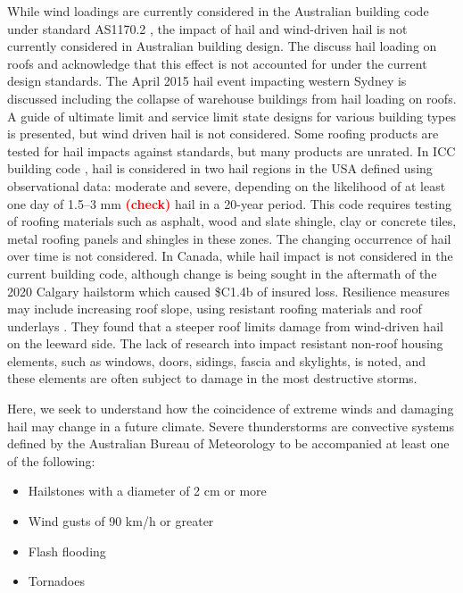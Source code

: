 \documentclass[]{agujournal2019}\usepackage[]{graphicx}\usepackage[]{xcolor}
\newcommand*{\todo}[1]{\textbf{\textcolor{red}{(#1)}}}
\begin{document}
While wind loadings are currently considered in the Australian building code \cite{ABCB_2024} under standard AS1170.2 \cite{Standards_2021}, the impact of hail and wind-driven hail is not currently considered in Australian building design. The  discuss hail loading on roofs and acknowledge that this effect is not accounted for under the current design standards. The April 2015 hail event impacting western Sydney is discussed including the collapse of warehouse buildings from hail loading on roofs. A guide of ultimate limit and service limit state designs for various building types is presented, but wind driven hail is not considered. Some roofing products are tested for hail impacts against standards, but many products are unrated. In ICC building code \cite{ICC_2008}, hail is considered in two hail regions in the USA defined using observational data: moderate and severe, depending on the likelihood of at least one day of 1.5--3 mm \todo{check} hail in a 20-year period. This code requires testing of roofing materials such as asphalt, wood and slate shingle, clay or concrete tiles, metal roofing panels and shingles in these zones. The changing occurrence of hail over time is not considered. In Canada, while hail impact is not considered in the current building code, although change is being sought in the aftermath of the 2020 Calgary hailstorm which caused \$C1.4b of insured loss. Resilience measures may include increasing roof slope, using resistant roofing materials and roof underlays \cite{ICLR_2018}. They found that a steeper roof limits damage from wind-driven hail on the leeward side. The lack of research into impact resistant non-roof housing elements, such as windows, doors, sidings, fascia and skylights, is noted, and these elements are often subject to damage in the most destructive storms.

Here, we seek to understand how the coincidence of extreme winds and damaging hail may change in a future climate. Severe thunderstorms are convective systems defined by the Australian Bureau of Meteorology to be accompanied at least one of the following:

\begin{itemize}
\item Hailstones with a diameter of 2 cm or more
\item Wind gusts of 90 km/h or greater
\item Flash flooding
\item Tornadoes
\end{itemize}
\end{document}
